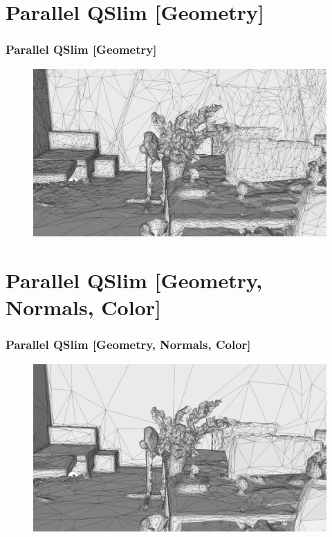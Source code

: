 \documentclass[
	10pt,
	t		%
]{beamer}
\begin{document}
\section{Parallel QSlim [Geometry]}
\begin{frame}
\frametitle{Parallel QSlim [Geometry]}
\begin{figure}[ht]
\centering
\includegraphics[width=1\textwidth]{my_3}
\end{figure}
\end{frame}

\section{Parallel QSlim [Geometry, Normals, Color]}
\begin{frame}
\frametitle{Parallel QSlim [Geometry, Normals, Color]}
\begin{figure}[ht]
\centering
\includegraphics[width=1\textwidth]{my_9}
\end{figure}
\end{frame}
\end{document}
